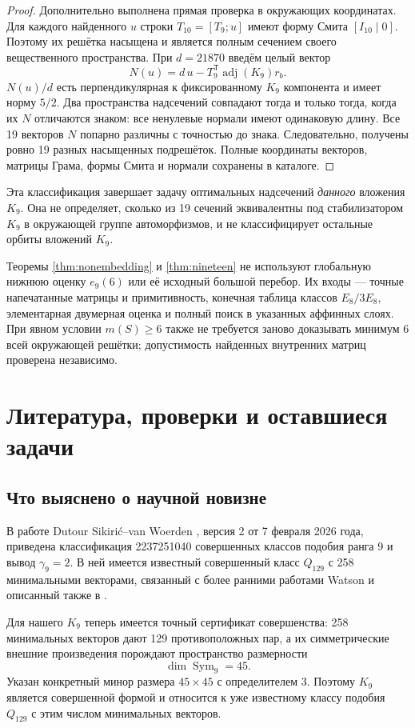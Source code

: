 \documentclass[11pt,a4paper]{article}
\theoremstyle{remark}\newtheorem{remark}[theorem]{Замечание}
\begin{document}
\begin{proof}
Дополнительно выполнена прямая проверка в окружающих координатах. Для каждого найденного $u$ строки $T_{10}=[T_9;u]$ имеют форму Смита $[I_{10}\mid0]$. Поэтому их решётка насыщена и является полным сечением своего вещественного пространства. При $d=21870$ введём целый вектор
\[
N(u)=d\,u-T_9^{\mathsf T}\operatorname{adj}(K_9)r_b.
\]
$N(u)/d$ есть перпендикулярная к фиксированному $K_9$ компонента и имеет норму $5/2$. Два пространства надсечений совпадают тогда и только тогда, когда их $N$ отличаются знаком: все ненулевые нормали имеют одинаковую длину. Все 19 векторов $N$ попарно различны с точностью до знака. Следовательно, получены ровно 19 разных насыщенных подрешёток. Полные координаты векторов, матрицы Грама, формы Смита и нормали сохранены в каталоге.
\end{proof}

Эта классификация завершает задачу оптимальных надсечений \emph{данного} вложения $K_9$. Она не определяет, сколько из 19 сечений эквивалентны под стабилизатором $K_9$ в окружающей группе автоморфизмов, и не классифицирует остальные орбиты вложений $K_9$.

Теоремы \ref{thm:nonembedding} и \ref{thm:nineteen} не используют глобальную нижнюю оценку $e_9(6)$ или её исходный большой перебор. Их входы --- точные напечатанные матрицы и примитивность, конечная таблица классов $E_8/3E_8$, элементарная двумерная оценка и полный поиск в указанных аффинных слоях. При явном условии $m(S)\ge6$ также не требуется заново доказывать минимум 6 всей окружающей решётки; допустимость найденных внутренних матриц проверена независимо.

\section{Литература, проверки и оставшиеся задачи}

\subsection{Что выяснено о научной новизне}

В работе Dutour Sikirić--van Woerden \cite{dw}, версия 2 от 7 февраля 2026 года, приведена классификация 2237251040 совершенных классов подобия ранга 9 и вывод $\gamma_9=2$. В ней имеется известный совершенный класс $Q_{129}$ с 258 минимальными векторами, связанный с более ранними работами Watson и описанный также в \cite{vwthesis}.

Для нашего $K_9$ теперь имеется точный сертификат совершенства: 258 минимальных векторов дают 129 противоположных пар, а их симметрические внешние произведения порождают пространство размерности
\[
\dim\operatorname{Sym}_9=45.
\]
Указан конкретный минор размера $45\times45$ с определителем 3. Поэтому $K_9$ является совершенной формой и относится к уже известному классу подобия $Q_{129}$ с этим числом минимальных векторов.
\end{document}
